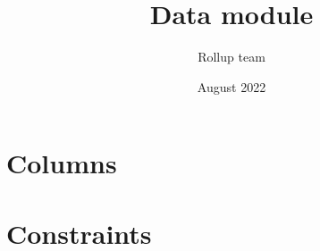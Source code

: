 \documentclass{article}
\title{Data module}
\author{Rollup team}
\date{August 2022}
\begin{document}
\maketitle
\tableofcontents

\section{Columns}
	

\section{Constraints}
	
\end{document}
